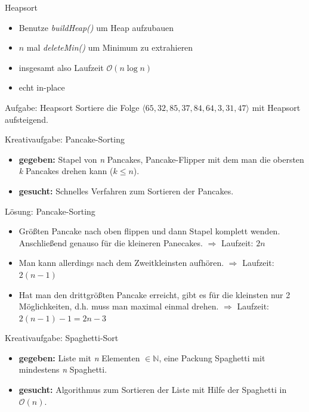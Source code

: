 \begin{frame}{Heapsort}
	\begin{itemize}
		\item Benutze \emph{buildHeap()} um Heap aufzubauen
		\item $n$ mal \emph{deleteMin()} um Minimum zu extrahieren
		\item insgesamt also Laufzeit $\mathcal{O}(n \log{n})$
		\item echt in-place
	\end{itemize}
\end{frame}

\begin{frame}{Aufgabe: Heapsort}
	Sortiere die Folge $\langle 65, 32, 85, 37, 84, 64, 3, 31, 47 \rangle$ mit Heapsort aufsteigend.
\end{frame}

\begin{frame}{Kreativaufgabe: Pancake-Sorting}
	\begin{itemize}
		\item \textbf{gegeben:} Stapel von \emph{n} Pancakes, Pancake-Flipper mit dem man die obersten \emph{k} Pancakes drehen kann ($ k \leq n $).
		\item \textbf{gesucht:} Schnelles Verfahren zum Sortieren der Pancakes.
	\end{itemize}
\end{frame}

\begin{frame}{Lösung: Pancake-Sorting}
	\begin{itemize}
		\item Größten Pancake nach oben flippen und dann Stapel komplett wenden. Anschließend genauso für die kleineren Panecakes.  $ \Rightarrow $ Laufzeit: $2n$
		\item Man kann allerdings nach dem Zweitkleinsten aufhören. $ \Rightarrow $ Laufzeit: $2(n - 1)$
		\item Hat man den drittgrößten Pancake erreicht, gibt es für die kleinsten nur 2 Möglichkeiten, d.h. muss man maximal einmal drehen. $ \Rightarrow $ Laufzeit: $2(n-1) - 1 = 2n - 3$
	\end{itemize}

\end{frame}

\begin{frame}{Kreativaufgabe: Spaghetti-Sort}
	\begin{itemize}
		\item \textbf{gegeben:} Liste mit \emph{n} Elementen $\in \mathbb{N}$, eine Packung Spaghetti mit mindestens \emph{n} Spaghetti.
		\item \textbf{gesucht:} Algorithmus zum Sortieren der Liste mit Hilfe der Spaghetti in $\mathcal{O}(n)$.
	\end{itemize}
\end{frame}

